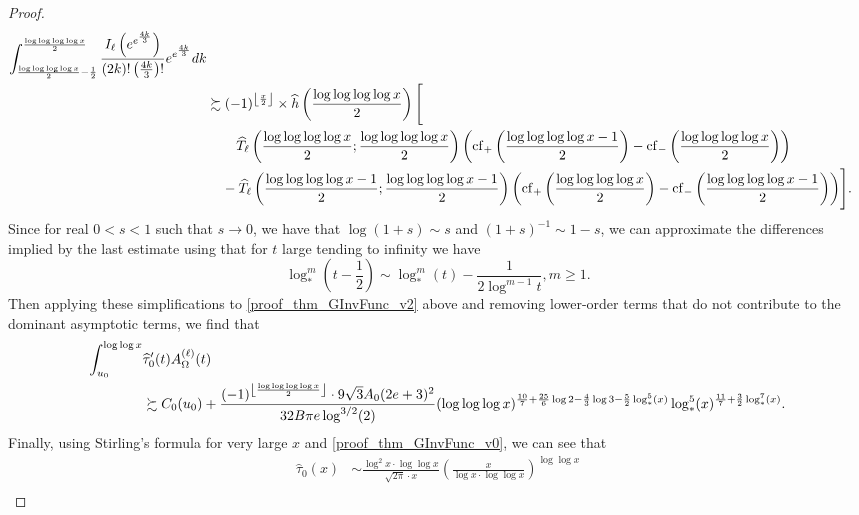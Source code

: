 \documentclass[11pt,reqno,a4letter]{article}
\numberwithin{figure}{section}
\numberwithin{table}{section}
\newcommand{\Floor}[2]{\ensuremath{\left\lfloor \frac{#1}{#2} \right\rfloor}}
\theoremstyle{plain}
\numberwithin{theorem}{section}
\theoremstyle{definition}
\begin{document}
\begin{proof}
\begin{align}
     \int_{\frac{\log\log\log\log x}{2}-\frac{1}{2}}^{\frac{\log\log\log\log x}{2}} 
     \frac{I_{\ell}\left(e^{e^{\frac{4k}{3}}}\right)}{(2k)! \left(\frac{4k}{3}\right)!} 
     e^{e^{\frac{4k}{3}}} dk \\ 
\notag 
     & \succsim (-1)^{\Floor{x}{2}} \times \widehat{h}\left(\frac{\log\log\log\log x}{2}\right) \Biggl[ \\ 
\notag 
     & \phantom{\succsim\ - } 
     \widehat{T}_{\ell}\left(\frac{\log\log\log\log x}{2}; \frac{\log\log\log\log x}{2}\right) \left( 
     \operatorname{cf}_{+}\left(\frac{\log\log\log\log x-1}{2}\right) - 
     \operatorname{cf}_{-}\left(\frac{\log\log\log\log x}{2}\right)
     \right) \\ 
\notag 
     & \phantom{\succsim\ } - 
     \widehat{T}_{\ell}\left(\frac{\log\log\log\log x-1}{2}; \frac{\log\log\log\log x-1}{2}\right) \left( 
     \operatorname{cf}_{+}\left(\frac{\log\log\log\log x}{2}\right) - 
     \operatorname{cf}_{-}\left(\frac{\log\log\log\log x-1}{2}\right)
     \right) 
     \Biggr]. 
\end{align} 
Since for real $0 < s < 1$ such that $s \rightarrow 0$, we have that $\log(1+s) \sim s$ and 
$(1+s)^{-1} \sim 1-s$, we can approximate the differences implied by the 
last estimate using that for $t$ large tending to infinity we have 
\[
     \log_{\ast}^m\left(t - \frac{1}{2}\right) \sim \log_{\ast}^{m}(t) - 
     \frac{1}{2 \log^{m-1} t}, m \geq 1. 
\] 
Then applying these simplifications to 
\eqref{proof_thm_GInvFunc_v2} above and removing lower-order terms that 
do not contribute to the dominant asymptotic terms, we find that 
\begin{align} 
\label{proof_thm_GInvFunc_v3} 
\int_{u_0}^{\log\log x} & \widehat{\tau}_0^{\prime}(t) A_{\Omega}^{(\ell)}(t) \\ 
\notag 
     & \succsim 
      C_0(u_0) + \frac{(-1)^{\Floor{\log\log\log\log x}{2}} \cdot 
      9 \sqrt{3} A_0 (2e+3)^2}{32 B\pi e \log^{3/2}(2)} 
      (\log\log\log x)^{\frac{10}{7} + \frac{25}{6}\log 2 - \frac{4}{3} \log 3 - 
      \frac{5}{2} \log_{\ast}^5(x)} 
      \log_{\ast}^5(x)^{\frac{11}{7} + \frac{3}{2} \log_{\ast}^7(x)}. 
\end{align} 
Finally, using Stirling's formula for very large $x$ and 
\eqref{proof_thm_GInvFunc_v0}, we can see that 
\begin{align*} 
\widehat{\tau}_0(x) & \sim \frac{\log^2 x \cdot \log\log x}{\sqrt{2\pi} \cdot x} \left( 
     \frac{x}{\log x \cdot \log\log x}\right)^{\log\log x} \\ 

\end{align*}
\end{proof}
\end{document}
